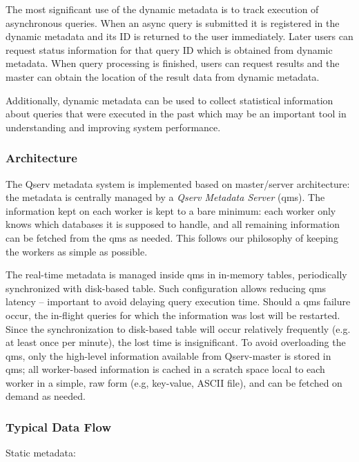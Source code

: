 \documentclass[DM,toc]{lsstdoc}
\begin{document}
The most significant use of the dynamic metadata is to track execution
of asynchronous queries. When an async query is submitted it is
registered in the dynamic metadata and its ID is returned to the user
immediately. Later users can request status information for that query
ID which is obtained from dynamic metadata. When query processing is
finished, users can request results and the master can
obtain the location of the result data from dynamic metadata.

Additionally, dynamic metadata can be used to collect statistical
information about queries that were executed in the past which may be an
important tool in understanding and improving system performance.

\subsubsection{Architecture}\label{architecture}

The Qserv metadata system is implemented based on master/server
architecture: the metadata is centrally managed by a \emph{Qserv
Metadata Server} (qms). The information kept on each worker is kept to a
bare minimum: each worker only knows which databases it is supposed to
handle, and all remaining information can be fetched from the qms
as needed. This follows our philosophy of keeping the workers as
simple as possible.

The real-time metadata is managed inside qms in in-memory tables,
periodically synchronized with disk-based table. Such configuration
allows reducing qms latency -- important to avoid delaying query
execution time. Should a qms failure occur, the in-flight queries for
which the information was lost will be restarted. Since the
synchronization to disk-based table will occur relatively frequently
(e.g. at least once per minute), the lost time is insignificant. To avoid
overloading the qms, only the high-level information available from
Qserv-master is stored in qms; all worker-based information is cached in
a scratch space local to each worker in a simple, raw form (e.g,
key-value, ASCII file), and can be fetched on demand as needed.

\subsubsection{Typical Data Flow}\label{typical-data-flow}

Static metadata:
\end{document}
